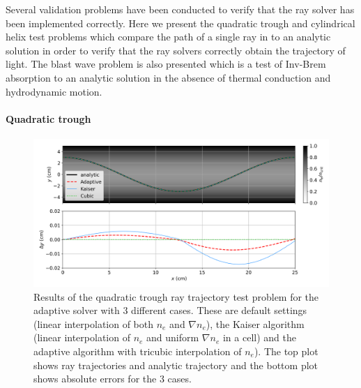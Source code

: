 Several validation problems have been conducted to verify that the ray solver has been implemented correctly.
Here we present the quadratic trough and cylindrical helix test problems which compare the path of a single ray in to an analytic solution in order to verify that the ray solvers correctly obtain the trajectory of light.
The blast wave problem is also presented which is a test of \ac{Inv-Brem} absorption to an analytic solution in the absence of thermal conduction and hydrodynamic motion.

\paragraph*{Quadratic trough}

\begin{figure}[t!]
    \includegraphics[width=\linewidth]{Numerics/Images/Quadtrough.png}
    \centering
    \caption{Results of the quadratic trough ray trajectory test problem for the adaptive solver with 3 different cases.
    These are default settings (linear interpolation of both $n_e$ and $\nabla n_e$), the Kaiser algorithm (linear interpolation of $n_e$ and uniform $\nabla n_e$ in a cell) and the adaptive algorithm with tricubic interpolation of $n_e$).
    The top plot shows ray trajectories and analytic trajectory and the bottom plot shows absolute errors for the 3 cases.}%
    \label{fig:SOLAS_quadtrough}
\end{figure}

